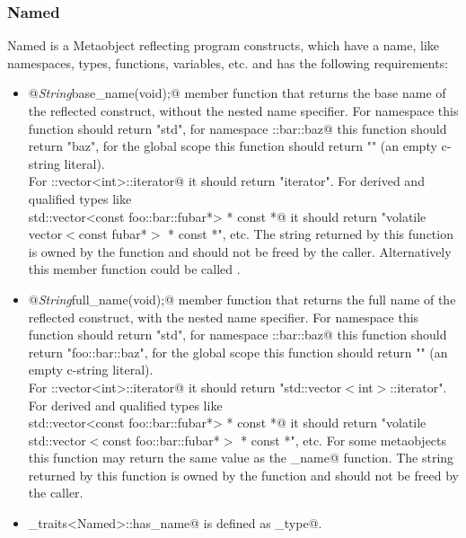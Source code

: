 \subsubsection{Named}

{\metaobject Named} is a {\metaobject Metaobject} reflecting program constructs,
which have a name, like namespaces, types, functions, variables, etc. and has
the following requirements:

\begin{itemize}

	\item{\verb@static @{\em String}\verb@ base_name(void);@} member function that returns the base name
	of the reflected construct, without the nested name specifier. For namespace
	\verb@std@ this function should return "std", for namespace \verb@foo::bar::baz@
	this function should return "baz", for the global scope this function
	should return "" (an empty c-string literal).\\For \verb@std::vector<int>::iterator@
	it should return "iterator". For derived and qualified types like \\
	\verb@volatile std::vector<const foo::bar::fubar*> * const *@ it should return
	"volatile vector$<$const fubar*$>$ * const *", etc. The string returned by this
	function is owned by the function and should not be freed by the caller. Alternatively 
	this member function could be called \verb@identifier@.

	\item{\verb@static @{\em String}\verb@ full_name(void);@} member function that returns the full name
	of the reflected construct, with the nested name specifier. For namespace
	\verb@std@ this function should return "std", for namespace \verb@foo::bar::baz@
	this function should return "foo::bar::baz", for the global scope this function
	should return "" (an empty c-string literal).\\For \verb@std::vector<int>::iterator@
	it should return "std::vector$<$int$>$::iterator". For derived and qualified types like\\
	\verb@volatile std::vector<const foo::bar::fubar*> * const *@ it should return
	"volatile std::vector$<$const foo::bar::fubar*$>$ * const *", etc. For some
	metaobjects this function may return the same value as the \verb@base_name@ function.
	The string returned by this function is owned by the function and should not be freed by the caller.
	

	\item \verb@metaobject_traits<Named>::has_name@ is defined as \verb@true_type@.
\end{itemize}

